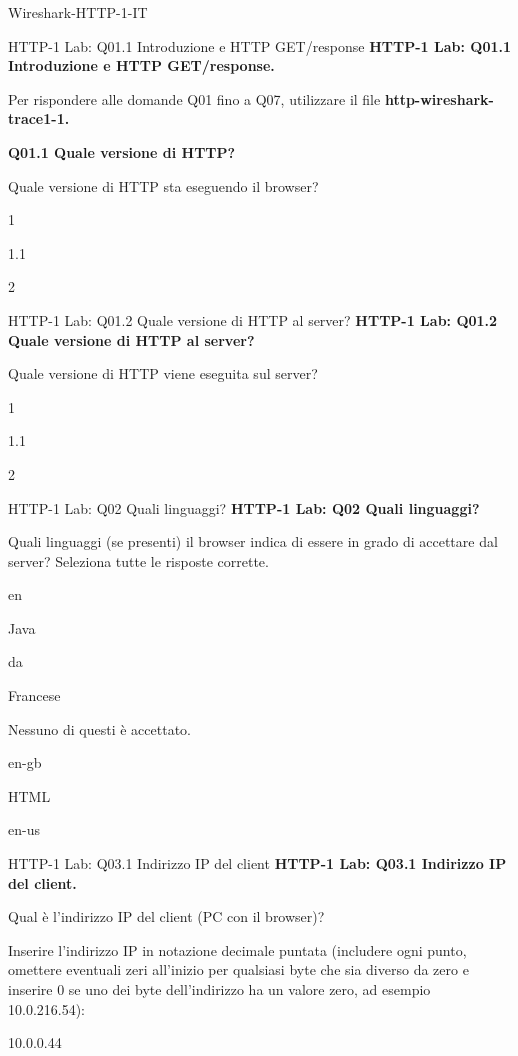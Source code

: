 \documentclass[a4paper]{article}
\begin{document}
\begin{quiz}{Wireshark-HTTP-1-IT}

\begin{multi}[points=1,shuffle]{HTTP-1 Lab: Q01.1 Introduzione e HTTP GET/response}
\textbf{HTTP-1 Lab: Q01.1 Introduzione e HTTP GET/response.}

Per rispondere alle domande Q01 fino a Q07, utilizzare il file \textbf{http-wireshark-trace1-1.}

\textbf{Q01.1 Quale versione di HTTP?} 

Quale versione di HTTP sta eseguendo il browser?
\item 1
\item* 1.1
\item 2
\end{multi}

\begin{multi}[points=1,shuffle]{HTTP-1 Lab: Q01.2 Quale versione di HTTP al server?}
\textbf{HTTP-1 Lab: Q01.2 Quale versione di HTTP al server?} 

Quale versione di HTTP viene eseguita sul server?
\item 1
\item* 1.1
\item 2
\end{multi}

\begin{multi}[points=1,shuffle,multiple]{HTTP-1 Lab: Q02 Quali linguaggi?}
\textbf{HTTP-1 Lab: Q02 Quali linguaggi?} 

Quali linguaggi (se presenti) il browser indica di essere in grado di accettare dal server? Seleziona tutte le risposte corrette.
\item* en
\item Java
\item da
\item Francese
\item Nessuno di questi è accettato.
\item en-gb
\item HTML
\item* en-us
\end{multi}

\begin{shortanswer}[points=1]{HTTP-1 Lab: Q03.1 Indirizzo IP del client}
\textbf{HTTP-1 Lab: Q03.1 Indirizzo IP del client.} 

Qual è l'indirizzo IP del client (PC con il browser)? 

Inserire l'indirizzo IP in notazione decimale puntata (includere ogni punto, omettere eventuali zeri all'inizio per qualsiasi byte che sia diverso da zero e inserire 0 se uno dei byte dell'indirizzo ha un valore zero, ad esempio 10.0.216.54):
\item 10.0.0.44
\end{shortanswer}


\end{quiz}
\end{document}
